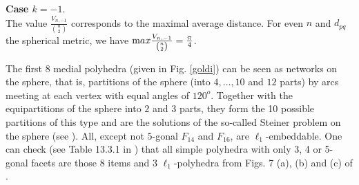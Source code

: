 \noindent
{\bf Case $k=-1$}.\\
The value $\frac{V_{n,-1}}{{n\choose 2}}$ corresponds to  the maximal average distance.
For even $n$ and $d_{pq}$ the spherical metric, we have 
${\mbox max }\frac{V_{n,-1}}{{n\choose 2}}=\frac{\pi}{4}$. 

\newpage
\begin{remark}
The first 8 medial polyhedra (given in Fig. \ref{goldi}) 
can be seen as networks on the sphere, that is, 
partitions of the sphere (into $4,\dots,10$ and $12$ parts) by arcs meeting at each vertex
with equal angles of $120^o$. Together with the equipartitions of the sphere into $2$ 
and $3$ parts, they form the 10 possible partitions of this type and are the solutions
of the so-called {\sc Steiner} problem on the sphere (see \cite{heppes}).
All, except not $5$-gonal $F_{14}$ and $F_{16}$, are $\ell_1$-embeddable.
One can check (see Table 13.3.1 in \cite{grun}) that
all simple polyhedra with only 3, 4 or 5-gonal facets are those 8 items and 3
$\ell_1$-polyhedra from Figs. 7 (a), (b) and (c) of \cite{dg96}.
\end{remark}

